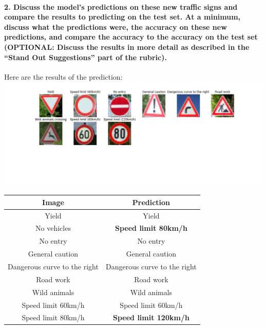 \documentclass[11pt]{article}
\makeatletter
\def\maxwidth{\ifdim\Gin@nat@width>\linewidth\linewidth
    \else\Gin@nat@width\fi}
\let\Oldincludegraphics\includegraphics
\renewcommand{\includegraphics}[1]{\Oldincludegraphics[width=.8\maxwidth]{#1}}
\makeatother
\begin{document}
\hypertarget{discuss-the-models-predictions-on-these-new-traffic-signs-and-compare-the-results-to-predicting-on-the-test-set.-at-a-minimum-discuss-what-the-predictions-were-the-accuracy-on-these-new-predictions-and-compare-the-accuracy-to-the-accuracy-on-the-test-set-optional-discuss-the-results-in-more-detail-as-described-in-the-stand-out-suggestions-part-of-the-rubric.}{%
\paragraph{2. Discuss the model's predictions on these new traffic signs
and compare the results to predicting on the test set. At a minimum,
discuss what the predictions were, the accuracy on these new
predictions, and compare the accuracy to the accuracy on the test set
(OPTIONAL: Discuss the results in more detail as described in the
``Stand Out Suggestions'' part of the
rubric).}\label{discuss-the-models-predictions-on-these-new-traffic-signs-and-compare-the-results-to-predicting-on-the-test-set.-at-a-minimum-discuss-what-the-predictions-were-the-accuracy-on-these-new-predictions-and-compare-the-accuracy-to-the-accuracy-on-the-test-set-optional-discuss-the-results-in-more-detail-as-described-in-the-stand-out-suggestions-part-of-the-rubric.}}

Here are the results of the prediction:
\includegraphics{./images/predictions.png}

\begin{longtable}[]{@{}cc@{}}
\toprule
Image & Prediction\tabularnewline
\midrule
\endhead
Yield & Yield\tabularnewline
No vehicles & \textbf{Speed limit 80km/h}\tabularnewline
No entry & No entry\tabularnewline
General caution & General caution\tabularnewline
Dangerous curve to the right & Dangerous curve to the
right\tabularnewline
Road work & Road work\tabularnewline
Wild animals & Wild animals\tabularnewline
Speed limit 60km/h & Speed limit 60km/h\tabularnewline
Speed limit 80km/h & \textbf{Speed limit 120km/h}\tabularnewline
\bottomrule
\end{longtable}
\end{document}
